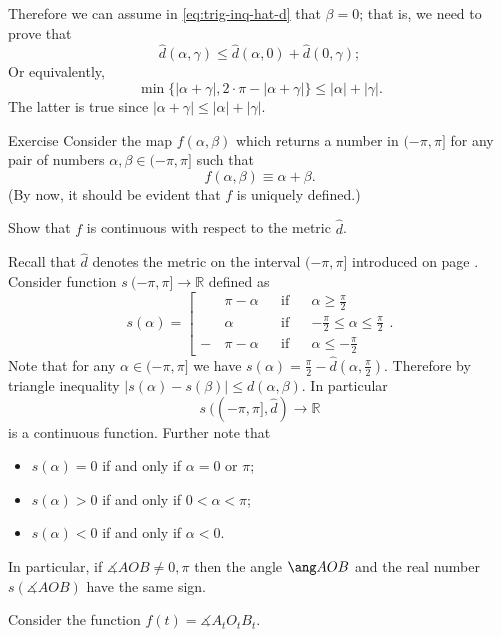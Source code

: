 Therefore we can assume in \ref{eq:trig-inq-hat-d}
that $\beta=0$;
that is, we need to prove that
$$\hat{d}(\alpha,\gamma)
\le 
\hat{d}(\alpha,0)+\hat{d}(0,\gamma);
$$
Or equivalently,
$$\min\{|\alpha+\gamma|,2\cdot\pi-|\alpha+\gamma|\}\le |\alpha|+|\gamma|.$$
The latter is true since 
$|\alpha+\gamma|\le |\alpha|+|\gamma|$.
\qeds

\begin{thm}{Exercise}\label{ex:hat-d-and-+}
Consider the map 
$f(\alpha,\beta)$ which returns a number in $(-\pi,\pi]$ for any pair of numbers $\alpha,\beta\in (-\pi,\pi]$
such that 
$$f(\alpha,\beta)\equiv \alpha+\beta.$$
(By now, it should be evident that $f$ is uniquely defined.)

Show that $f$ is continuous with respect to the metric $\hat d$.
\end{thm}











Recall that $\hat d$ denotes the metric on the interval $(-\pi,\pi]$
introduced on page \pageref{def:max-dist}.
Consider function $s\:(-\pi,\pi]\to \mathbb{R}$
defined as 
$$s(\alpha)=\left[
\begin{aligned}
&\pi-\alpha&&\text{if}&&\alpha\ge\tfrac\pi2
\\
&\alpha&&\text{if}&&-\tfrac\pi2\le\alpha\le\tfrac\pi2
\\
-\,&\pi-\alpha&&\text{if}&&\alpha\le-\tfrac\pi2
\end{aligned}
\right.
.$$
Note that for any $\alpha\in (-\pi,\pi]$ we have
$s(\alpha)=\tfrac\pi2-\hat d(\alpha,\tfrac\pi2)$.
Therefore by triangle inequality
$|s(\alpha)-s(\beta)|\le d(\alpha,\beta)$. 
In particular 
$$s\:((-\pi,\pi],\hat{d})\to\mathbb{R}$$ 
is a continuous function.
Further note that
\begin{itemize}
\item $s(\alpha)=0$ if and only if $\alpha=0$ or $\pi$;
\item $s(\alpha)>0$ if and only if $0<\alpha<\pi$;
\item $s(\alpha)<0$ if and only if $\alpha<0$.
\end{itemize}
In particular, if $\measuredangle AOB\ne 0,\pi$ 
then the angle $\ang AOB$ and the real number $s(\measuredangle AOB)$ have the same sign.

Consider the function 
$f(t)=\measuredangle A_tO_tB_t$.

